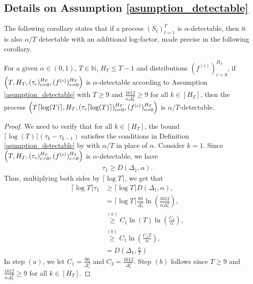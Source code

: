     
{\color{black}
\subsection{Details on Assumption \ref{asumption_detectable}}

The following corollary states that if a process $(S_t)_{t=1}^T$ is $\alpha$-detectable, then it is also $\alpha/T$ detectable with an additional log-factor, made precise in the following corollary.

\begin{corollary}
    For a given $\alpha \in (0,1)$, $T \in \mathbb{N}$, $H_T \leq T-1$ and distributions $(f^{(c)})_{c=0}^{H_T}$, if $\Bigl(T,H_T, (\tau_c)_{c=0}^{H_T}, (f^{(c)})_{c=0}^{H_T}\Bigr)$ is $\alpha$-detectable according to Assumption \ref{asumption_detectable} with $T \geq 9$ and $\frac{1612}{\alpha \Delta_k^2} \geq 9$ for all $k \in [H_T]$, then the process $\Bigl( T\lceil  \log(T) \rceil ,H_T, (\tau_c \lceil \log(T) \rceil)_{c=0}^{H_T}, (f^{(c)})_{c=0}^{H_T}\Bigr)$ is $\alpha/T$-detectable.
    \label{cor:weaker_assumption}
\end{corollary}
\begin{proof}
    We need to verify that for all $k \in [H_T]$, the bound $\lceil \log(T) \rceil (\tau_{k} - \tau_{k-1})$ satisfies the conditions in Definition \ref{asumption_detectable} by with $\alpha/T$ in place of $\alpha$.  Consider $k=1$. Since $\Bigl(T,H_T, (\tau_c)_{c=0}^{H_T}, (f^{(c)})_{c=0}^{H_T}\Bigr)$ is $\alpha$-detectable, we have 
    \begin{align*}
        \tau_1 \geq D(\Delta_1, \alpha).
    \end{align*}
    Thus, multiplying both sides by $\lceil \log{T} \rceil$, we get that 
    \begin{align*}
        \lceil \log{T} \rceil \tau_1 &\geq \lceil \log{T} \rceil D(\Delta_1, \alpha), \\
        &= \lceil \log{T} \rceil \frac{80}{\Delta^2_1}\ln \left( \frac{1612}{\alpha \Delta^2_1}\right), \\
        &\stackrel{(a)}{\geq} C_1 \ln(T) \ln \left( \frac{C_2}{\alpha}\right), \\
        &\stackrel{(b)}{\geq} C_1 \ln \left( \frac{C_2 T}{\alpha} \right), \\
        &= D \left( \Delta_1, \frac{\alpha}{T} \right)
    \end{align*}
    In step $(a)$, we let $C_1 = \frac{80}{\Delta_1^2}$ and $C_2 = \frac{1612}{\Delta_1^2}$. Step $(b)$ follows since $T \geq 9$ and $\frac{1612}{\alpha \Delta_k^2} \geq 9$ for all $k \in [H_T]$. 
\end{proof}
}

